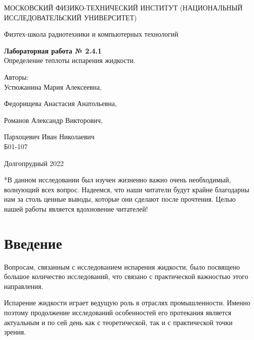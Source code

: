 \documentclass[a4paper,10pt]{article} %
\date{\today}
\begin{document}
\begin{titlepage}
	\begin{center}
		{\large МОСКОВСКИЙ ФИЗИКО-ТЕХНИЧЕСКИЙ ИНСТИТУТ (НАЦИОНАЛЬНЫЙ ИССЛЕДОВАТЕЛЬСКИЙ УНИВЕРСИТЕТ)}
	\end{center}
	\begin{center}
		{\large Физтех-школа радиотехники и компьютерных технологий}
	\end{center}
	
	
	\vspace{4cm}
	{\huge
		\begin{center}
			{\bf Лабораторная работа № 2.4.1}\\
			 Определение теплоты испарения жидкости.
		\end{center}
	}
	\vspace{3cm}
	\begin{flushright}
		{\LARGE Авторы:\\ Устюжанина Мария Алексеевна,

		Федорищева Анастасия Анатольевна, 

		Романов Александр Викторович, 

		Пархоцевич Иван Николаевич\\
			\vspace{0.3cm}
			Б01-107}
	\end{flushright}
	\vspace{4.5 cm}
	\begin{center}
		Долгопрудный 2022

	\vspace{1 cm}

		 *В данном исследовании был изучен жизненно важно очень необходимый, волнующий всех вопрос. 
		 Надеемся, что наши читатели будут крайне благодарны нам за столь ценные выводы, которые они сделают 
		 после прочтения. Целью нашей работы является вдохновение читателей!

	\end{center}
\end{titlepage}

\section{Введение}

Вопросам, связанным с исследованием испарения жидкости, было посвящено большое количество исследований, что 
связано с практической важностью этого направления. 

Испарение жидкости играет ведущую роль в отраслях промышленности. Именно поэтому продолжение исследований 
особенностей его протекания является актуальным и по сей день как с теоретической, так и с практической точки 
зрения.
\end{document}
